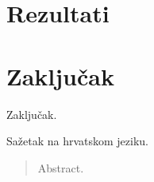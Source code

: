 \documentclass[times, utf8, zavrsni]{fer}
\begin{document}
\chapter{Rezultati}

\chapter{Zaključak}
Zaključak.



\nocite{*}

\begin{sazetak}
Sažetak na hrvatskom jeziku.

\end{sazetak}

\begin{abstract}
Abstract.

\end{abstract}
\end{document}
